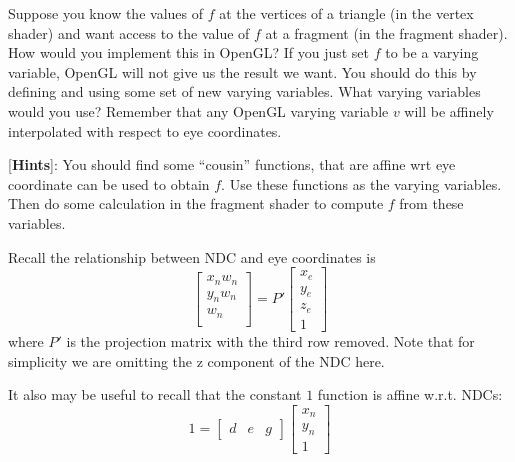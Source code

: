 \documentclass[letterpaper, 11pt]{article}
\begin{document}
\begin{enumerate}
Suppose you know the values of $f$ at the vertices of a triangle
(in the vertex shader)
and want access to the value of $f$ at a fragment (in the fragment shader).
How would you implement this  in OpenGL?
If you just set $f$ to be a varying variable, OpenGL will not give us
the result we want. You should do this by defining and using
some set of new varying variables.
What varying variables would you use? Remember that any
OpenGL varying variable $v$
will be affinely interpolated with respect to eye coordinates.

[{\bf Hints}]: You should find some ``cousin'' functions,
that are affine wrt eye coordinate can be used to obtain $f$.
Use these functions as the varying variables.
Then do some 
calculation in the fragment shader to compute $f$ from these variables.

Recall the relationship between NDC and eye coordinates is
$$
\left[\begin{array}{c}
    x_n w_n \\
    y_n w_n\\
    w_n \\
\end{array}\right] = P' \left[\begin{array}{c}
    x_e \\
    y_e \\
    z_e \\
    1
\end{array}\right]
$$
where $P'$ is the projection matrix with the third row removed. Note
that for simplicity we are omitting the z component of the NDC here.

It also may be useful to recall that
the constant $1$ function is affine w.r.t. NDCs:
$$
1 = \left[\begin{array}{ccc} d & e & g \end{array}\right] \left[\begin{array}{c}
x_n\\
y_n\\
1
\end{array}\right]
$$

\end{enumerate}
\end{document}
